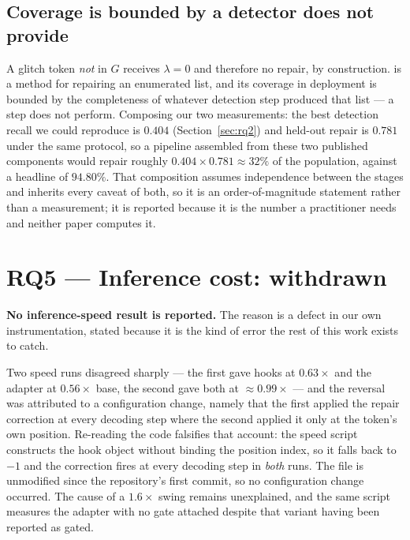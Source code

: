 \subsection{Coverage is bounded by a detector \gc{} does not provide}

A glitch token \emph{not} in $G$ receives $\lambda = 0$ and therefore no repair,
by construction. \gc{} is a method for repairing an enumerated list, and its
coverage in deployment is bounded by the completeness of whatever detection step
produced that list --- a step \gc{} does not perform. Composing our two
measurements: the best detection recall we could reproduce is $0.404$
(Section~\ref{sec:rq2}) and held-out repair is $0.781$ under the same protocol,
so a pipeline assembled from these two published components would repair roughly
$0.404 \times 0.781 \approx 32\%$ of the population, against a headline of
$94.80\%$. That composition assumes independence between the stages and inherits
every caveat of both, so it is an order-of-magnitude statement rather than a
measurement; it is reported because it is the number a practitioner needs and
neither paper computes it.

\section{RQ5 --- Inference cost: withdrawn}
\label{sec:rq5}

\textbf{No inference-speed result is reported.} The reason is a defect in our own
instrumentation, stated because it is the kind of error the rest of this work
exists to catch.

Two speed runs disagreed sharply --- the first gave \gp{} hooks at $0.63\times$
and the \gc{} adapter at $0.56\times$ base, the second gave both at
$\approx 0.99\times$ --- and the reversal was attributed to a configuration
change, namely that the first applied the repair correction at every decoding
step where the second applied it only at the token's own position. Re-reading the
code falsifies that account: the speed script constructs the hook object without
binding the position index, so it falls back to $-1$ and the correction fires at
every decoding step in \emph{both} runs. The file is unmodified since the
repository's first commit, so no configuration change occurred. The cause of a
$1.6\times$ swing remains unexplained, and the same script measures the \gc{}
adapter with no gate attached despite that variant having been reported as gated.


